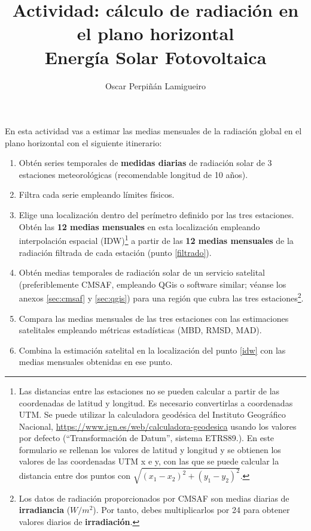 \documentclass[11pt]{article}
\author{Oscar Perpiñán Lamigueiro}
\date{}
\title{Actividad: cálculo de radiación en el plano horizontal\\\medskip
\large Energía Solar Fotovoltaica}
\begin{document}
\maketitle

En esta actividad vas a estimar las medias mensuales de la radiación
global en el plano horizontal con el siguiente itinerario:

\begin{enumerate}
\item Obtén series temporales de \textbf{medidas diarias} de radiación
  solar de 3 estaciones meteorológicas (recomendable longitud de 10
  años).
\item Filtra cada serie empleando límites físicos. \label{filtrado}
\item Elige una localización dentro del perímetro definido por las
  tres estaciones. Obtén las \textbf{12 medias mensuales} en esta
  localización empleando interpolación espacial (IDW)\footnote{Las
    distancias entre las estaciones no se pueden calcular a partir de
    las coordenadas de latitud y longitud. Es necesario convertirlas a
    coordenadas UTM. Se puede utilizar la calculadora geodésica del
    Instituto Geográfico Nacional,
    \url{https://www.ign.es/web/calculadora-geodesica} usando los
    valores por defecto (``Transformación de Datum'', sistema
    ETRS89.). En este formulario se rellenan los valores de latitud y
    longitud y se obtienen los valores de las coordenadas UTM x e y,
    con las que se puede calcular la distancia entre dos puntos con
    $\sqrt{(x_1 - x_2)^2 + (y_1 - y_2)^2}$.} a partir de las
  \textbf{12 medias mensuales} de la radiación filtrada de cada
  estación (punto \ref{filtrado}). \label{idw}
\item Obtén medias temporales de radiación solar de un servicio
  satelital (preferiblemente CMSAF, empleando QGis o software similar;
  véanse los anexos \ref{sec:cmsaf} y \ref{sec:qgis}) para una región que
  cubra las tres estaciones\footnote{Los datos de radiación
    proporcionados por CMSAF son medias diarias de
    \textbf{irradiancia} (\(W/m^2\)). Por tanto, debes multiplicarlos
    por 24 para obtener valores diarios de
    \textbf{irradiación}.}.\label{satelite}
\item Compara las medias mensuales de las tres estaciones con las
  estimaciones satelitales empleando métricas estadísticas (MBD, RMSD,
  MAD).
\item Combina la estimación satelital en la localización del punto
  \ref{idw} con las medias mensuales obtenidas en ese punto.
\end{enumerate}
\end{document}

